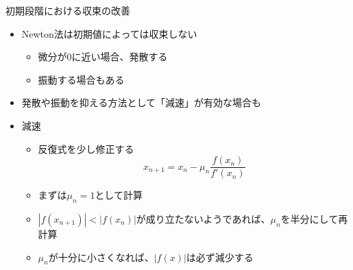 \begin{frame}[t,fragile]{初期段階における収束の改善}
  \begin{itemize}
  \item Newton法は初期値によっては収束しない
  \begin{itemize}
    \item 微分が0に近い場合、発散する
    \item 振動する場合もある
  \end{itemize}
  \item 発散や振動を抑える方法として「減速」が有効な場合も
  \item 減速
    \begin{itemize}
    \item 反復式を少し修正する
      \[
      x_{n+1} = x_n - \mu_n \frac{f(x_n)}{f'(x_n)}
      \]
    \item まずは$\mu_n=1$として計算
    \item $|f(x_{n+1})| < |f(x_{n})|$が成り立たないようであれば、$\mu_n$を半分にして再計算
    \item $\mu_n$が十分に小さくなれば、$|f(x)|$は必ず減少する
    \end{itemize}
  \end{itemize}
\end{frame}

